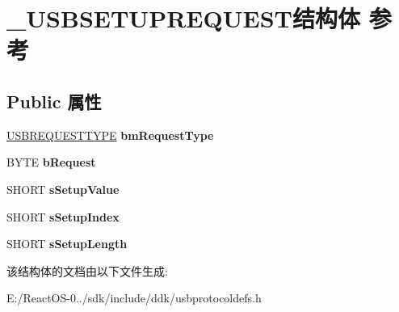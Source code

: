 \hypertarget{struct___u_s_b_s_e_t_u_p_r_e_q_u_e_s_t}{}\section{\+\_\+\+U\+S\+B\+S\+E\+T\+U\+P\+R\+E\+Q\+U\+E\+S\+T结构体 参考}
\label{struct___u_s_b_s_e_t_u_p_r_e_q_u_e_s_t}
\subsection*{Public 属性}
\begin{DoxyCompactItemize}
\item 
\mbox{\label{struct___u_s_b_s_e_t_u_p_r_e_q_u_e_s_t_a58789aed1bbf02daa4529e074371d344}} 
\hyperlink{union___u_s_b_r_e_q_u_e_s_t_t_y_p_e}{U\+S\+B\+R\+E\+Q\+U\+E\+S\+T\+T\+Y\+PE} {\bfseries bm\+Request\+Type}
\item 
\mbox{\label{struct___u_s_b_s_e_t_u_p_r_e_q_u_e_s_t_a8ba349fcf378f4f35e32ac87a78fdef8}} 
B\+Y\+TE {\bfseries b\+Request}
\item 
\mbox{\label{struct___u_s_b_s_e_t_u_p_r_e_q_u_e_s_t_af4131c7b066a6468665e61e135215fad}} 
S\+H\+O\+RT {\bfseries s\+Setup\+Value}
\item 
\mbox{\label{struct___u_s_b_s_e_t_u_p_r_e_q_u_e_s_t_ab8e5cceea303310a18504755e7570c9e}} 
S\+H\+O\+RT {\bfseries s\+Setup\+Index}
\item 
\mbox{\label{struct___u_s_b_s_e_t_u_p_r_e_q_u_e_s_t_acad30f2e5b337eee547b280ad0667ffd}} 
S\+H\+O\+RT {\bfseries s\+Setup\+Length}
\end{DoxyCompactItemize}


该结构体的文档由以下文件生成\+:\begin{DoxyCompactItemize}
\item 
E\+:/\+React\+O\+S-\/0../sdk/include/ddk/usbprotocoldefs.\+h\end{DoxyCompactItemize}
